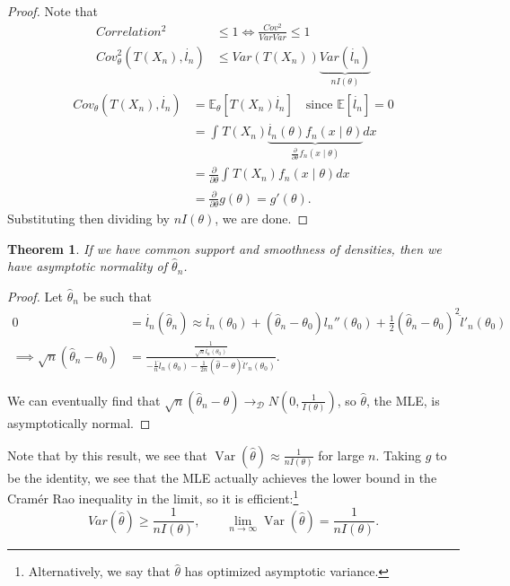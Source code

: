 \documentclass{tufte-handout}
\newcommand*\E{\mathbb{E}}
\newtheorem{thm}{Theorem}[subsection]
\theoremstyle{definition}
\begin{document}
\begin{proof}
	Note that
	\begin{align*}
		Correlation^2 &\le 1 \iff \frac{Cov^2}{Var Var} \le 1 \\
		Cov_{\theta}^2(T(X_n), \dot{l_n}) &\le Var(T(X_n)) \underbrace{Var(\dot{l_n})}_{nI(\theta)} \end{align*} \begin{align*}
		Cov_{\theta}(T(X_n), \dot{l_n}) &= \E_\theta\left[T(X_n) \dot{l_n}\right] \quad \text{since $\E\left[\dot{l_n}\right] = 0$} \\
										&= \int_{}^{} T(X_n) \underbrace{ \dot{l_n}(\theta) f_n(x\mid\theta)}_{\frac{\partial }{\partial \theta} f_n(x\mid\theta)}dx  \\
										&= \frac{\partial }{\partial \theta} \int_{}^{} T(X_n) f_n(x\mid\theta)dx \\
										&= \frac{\partial }{\partial \theta} g(\theta) = g'(\theta)
	.\end{align*}
	Substituting then dividing by $nI(\theta)$, we are done.
\end{proof}

\begin{thm}
	If we have common support and smoothness of densities, then we have asymptotic normality of $\hat{\theta}_n$.
\end{thm}

\begin{proof}
	Let $\hat{\theta}_n$ be such that \begin{align*}
		0 &= \dot{l_n} (\hat{\theta}_n) \approx \dot{l_n}(\theta_0) + \left( \hat{\theta}_n - \theta_0 \right) l_n''(\theta_0) + \frac{1}{2} (\hat{\theta}_n - \theta_0)^2 \ddot{l}'_n(\theta_0) \\
		\implies \sqrt{n} \left( \hat{\theta}_n - \theta_0 \right) &= \frac{\frac{1}{\sqrt{n} \dot{l_n}(\theta_0)}}{-\frac{1}{n}\ddot{l}_n(\theta_0) - \frac{1}{2n}(\hat{\theta}-\theta)\ddot{l}'_n(\theta_0)}
	.\end{align*}

	We can eventually find that $\sqrt{n} (\hat{\theta}_n-\theta) \to_{\mathscr{D}} N(0, \frac{1}{I(\theta)})$, so $\hat{\theta}$, the MLE, is asymptotically normal.
\end{proof}

Note that by this result, we see that $\operatorname{Var}(\hat{\theta}) \approx \frac{1}{nI(\theta)}$ for large $n$. Taking $g$ to be the identity, we see that the MLE actually achieves the lower bound in the Cram\'er Rao inequality in the limit, so it is efficient:\footnote{Alternatively, we say that $\hat{\theta}$ has optimized asymptotic variance.} \[
	Var(\hat{\theta}) \ge \frac{1}{nI(\theta)}, \qquad \lim\limits_{n \to \infty} \operatorname{Var}(\hat{\theta}) = \frac{1}{nI(\theta)}
.\] 
\end{document}
